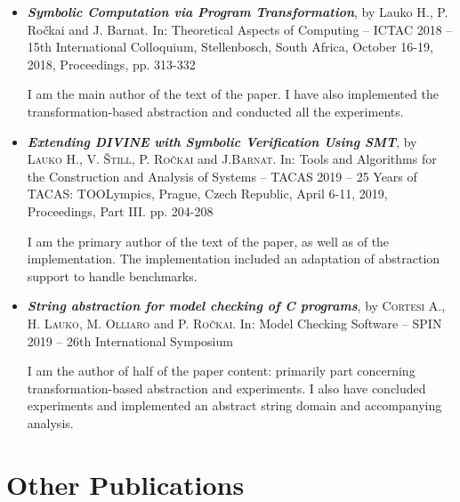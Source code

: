 \begin{itemize}

\item \textbf{\emph{Symbolic Computation via Program Transformation}}, by Lauko
H., P. Ročkai and J. Barnat.  In: Theoretical Aspects of Computing -- ICTAC 2018 --
15th International Colloquium, Stellenbosch, South Africa, October 16-19, 2018,
Proceedings, pp. 313-332~\cite{Lauko2018SymComp}

I am the main author of the text of the paper. I have also implemented the
transformation-based abstraction and conducted all the experiments.

\item \emph{\textbf{Extending \textsf{DIVINE} with Symbolic Verification Using SMT}},
by \textsc{Lauko} H., V. \textsc{Štill}, P. \textsc{Ročkai} and J.\textsc{Barnat}.
In: Tools and Algorithms for the Construction and Analysis of Systems -- TACAS 2019 --
25 Years of TACAS: TOOLympics, Prague, Czech Republic, April 6-11, 2019,
Proceedings, Part III. pp. 204-208~\cite{Lauko2019Sym}

I am the primary author of the text of the paper, as well as of the
implementation. The implementation included an adaptation of \divine
abstraction support to handle \svcomp benchmarks.

\item \textbf{\emph{String abstraction for model checking of C programs}},
by \textsc{Cortesi} A., H. \textsc{Lauko}, M. \textsc{Olliaro} and P. \textsc{Ročkai}.
        In: Model Checking Software -- SPIN 2019 -- 26th International Symposium~\cite{Lauko2019String}

I am the author of half of the paper content: primarily part concerning
transformation-based abstraction and experiments. I also have concluded
experiments and implemented an abstract string domain and accompanying
\lart analysis.

\end{itemize}

\section{Other Publications}


